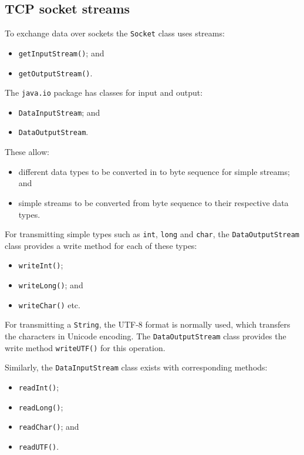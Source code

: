 \documentclass[a4paper]{systems-software}
\begin{document}
\subsection*{TCP socket streams}

To exchange data over sockets the \texttt{Socket} class uses streams:
\begin{itemize}
	\item \texttt{getInputStream()}; and
	\item \texttt{getOutputStream()}.	
\end{itemize}

The \texttt{java.io} package has classes for input and output:
\begin{itemize}
	\item \texttt{DataInputStream}; and
	\item \texttt{DataOutputStream}.
\end{itemize}
These allow:
\begin{itemize}
	\item different data types to be converted in to byte sequence for simple streams; and
	\item simple streams to be converted from byte sequence to their respective data types.
\end{itemize}

For transmitting simple types such as \texttt{int}, \texttt{long} and \texttt{char}, the \texttt{DataOutputStream} class provides a write method for each of these types:
\begin{itemize}
	\item \texttt{writeInt()};
	\item \texttt{writeLong()}; and
	\item \texttt{writeChar()} etc.
\end{itemize}

For transmitting a \texttt{String}, the UTF-8 format is normally used, which transfers the characters in Unicode encoding. The \texttt{DataOutputStream} class provides the write method \texttt{writeUTF()} for this operation.

Similarly, the \texttt{DataInputStream} class exists with corresponding methods:
\begin{itemize}
	\item \texttt{readInt()};
	\item \texttt{readLong()};
	\item \texttt{readChar()}; and
	\item \texttt{readUTF()}.
\end{itemize}
\end{document}
